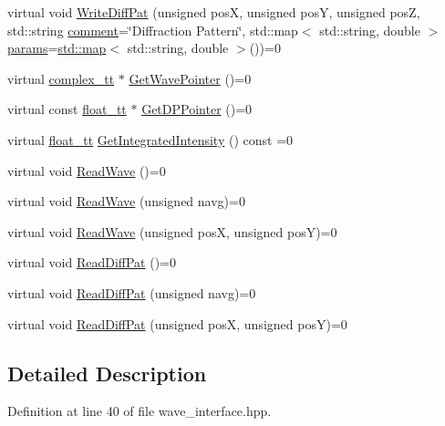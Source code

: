 \begin{DoxyCompactItemize}
virtual void \hyperlink{class_q_s_t_e_m_1_1_i_wave_a3f9e4e1fb93a3317d767a52e019fdf64}{Write\-Diff\-Pat} (unsigned pos\-X, unsigned pos\-Y, unsigned pos\-Z, std\-::string \hyperlink{image_sim_8m_aea4cc4bd8e43a7f8ebf9b0ee3da8d681}{comment}=\char`\"{}Diffraction Pattern\char`\"{}, std\-::map$<$ std\-::string, double $>$\hyperlink{image_sim_8m_ad57b218fb254a1624c09ad71cb6b6415}{params}=\hyperlink{_displacement_params_8m_af619c74fd72bdb64d115463dff2720cd}{std\-::map}$<$ std\-::string, double $>$())=0
\item 
virtual \hyperlink{namespace_q_s_t_e_m_afa320ea3cd2f5ff080c422f81b803a32}{complex\-\_\-tt} $\ast$ \hyperlink{class_q_s_t_e_m_1_1_i_wave_afade99c5af96d91cf3bc575c98ebe0d3}{Get\-Wave\-Pointer} ()=0
\item 
virtual const \hyperlink{namespace_q_s_t_e_m_a915d7caa497280d9f927c4ce8d330e47}{float\-\_\-tt} $\ast$ \hyperlink{class_q_s_t_e_m_1_1_i_wave_a1d868cff5662f1fa6b1da881db1c09ed}{Get\-D\-P\-Pointer} ()=0
\item 
virtual \hyperlink{namespace_q_s_t_e_m_a915d7caa497280d9f927c4ce8d330e47}{float\-\_\-tt} \hyperlink{class_q_s_t_e_m_1_1_i_wave_affdf9d420de6d321cdb3fcf67e0506bd}{Get\-Integrated\-Intensity} () const =0
\item 
virtual void \hyperlink{class_q_s_t_e_m_1_1_i_wave_a2f91d0a7d872317af7beeb7e55e53812}{Read\-Wave} ()=0
\item 
virtual void \hyperlink{class_q_s_t_e_m_1_1_i_wave_a0002b0142c4b922c50af7c83dfffb233}{Read\-Wave} (unsigned navg)=0
\item 
virtual void \hyperlink{class_q_s_t_e_m_1_1_i_wave_a281e10e9977758d829db6c3359e3e731}{Read\-Wave} (unsigned pos\-X, unsigned pos\-Y)=0
\item 
virtual void \hyperlink{class_q_s_t_e_m_1_1_i_wave_afd22aec8049818fe6a12c8ff9d6f7895}{Read\-Diff\-Pat} ()=0
\item 
virtual void \hyperlink{class_q_s_t_e_m_1_1_i_wave_a8d9647aa62666991b01dc9693ff5f6d6}{Read\-Diff\-Pat} (unsigned navg)=0
\item 
virtual void \hyperlink{class_q_s_t_e_m_1_1_i_wave_a66358ddc5f684cf8d99eac69bef7cbd4}{Read\-Diff\-Pat} (unsigned pos\-X, unsigned pos\-Y)=0
\end{DoxyCompactItemize}


\subsection{Detailed Description}


Definition at line 40 of file wave\-\_\-interface.\-hpp.



